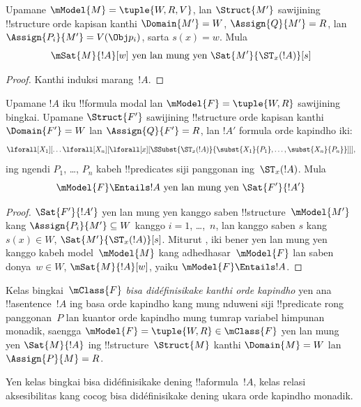 \documentclass[../../../include/open-logic-section]{subfiles}
\begin{document}
\begin{prop}
  Upamane $\mModel{M} = \tuple{W, R, V}$, lan $\Struct{M'}$
  sawijining !!{structure} orde kapisan kanthi $\Domain{M'} = W$,
  $\Assign{Q}{M'} = R$, lan $\Assign{P_i}{M'} = V(\Obj p_i)$,
  sarta $s(x) = w$. Mula
  \[
  \mSat{M}{!A}[w] \text{ yen lan mung yen } \Sat{M'}{\ST_x(!A)}[s]
  \]
\end{prop}

\begin{proof}
  Kanthi induksi marang~$!A$.
\end{proof}

\begin{prop}
  Upamane $!A$ iku !!{formula} modal lan $\mModel{F} = \tuple{W, R}$
  sawijining bingkai. Upamane $\Struct{F'}$ sawijining !!{structure}
  orde kapisan kanthi $\Domain{F'} = W$ lan $\Assign{Q}{F'} = R$,
  lan $!A'$ formula orde kapindho iki:
  \[
  \lforall[X_1][\dots\lforall[X_n][\lforall[x][
        \SSubst{\ST_x(!A)}{\subst{X_1}{P_1}, \dots,
          \subst{X_n}{P_n}}]]],
  \]
  ing ngendi $P_1$, \dots, $P_n$ kabeh !!{predicate}s siji panggonan
  ing~$\ST_x(!A)$. Mula
  \[
  \mModel{F} \Entails !A \text{ yen lan mung yen } \Sat{F'}{!A'}
  \]
\end{prop}

\begin{proof}
  $\Sat{F'}{!A'}$ yen lan mung yen kanggo saben !!{structure}~$\mModel{M'}$
  kang $\Assign{P_i}{M'} \subseteq W$ kanggo $i = 1$, \dots,~$n$,
  lan kanggo saben $s$ kang $s(x) \in W$,
  $\Sat{M'}{\ST_x(!A)}[s]$. Miturut , iki bener yen
  lan mung yen kanggo kabeh model~$\mModel{M}$ kang
  adhedhasar~$\mModel{F}$ lan saben donya~$w \in W$,
  $\mSat{M}{!A}[w]$, yaiku $\mModel{F} \Entails !A$.
\end{proof}

\begin{defn}
  Kelas bingkai~$\mClass{F}$ \emph{bisa didéfinisikake kanthi orde
    kapindho} yen ana !!a{sentence}~$!A$ ing basa orde kapindho kang
  mung nduweni siji !!{predicate} rong panggonan~$P$ lan kuantor orde kapindho
  mung tumrap variabel himpunan monadik, saengga $\mModel{F} =
  \tuple{W, R} \in \mClass{F}$ yen lan mung yen $\Sat{M}{!A}$ ing
  !!{structure}~$\Struct{M}$ kanthi $\Domain{M} = W$ lan
  $\Assign{P}{M} = R$.
\end{defn}

\begin{cor}
  Yen kelas bingkai bisa didéfinisikake dening !!a{formula}~$!A$,
  kelas relasi aksesibilitas kang cocog bisa didéfinisikake dening
  ukara orde kapindho monadik.
\end{cor}
\end{document}
